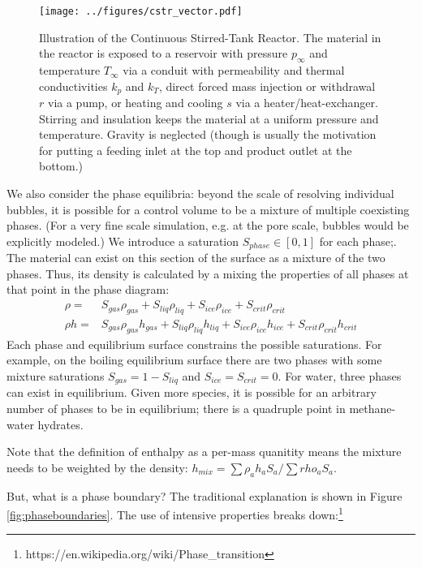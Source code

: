 \documentclass[AMA,STIX1COL]{WileyNJD-v2}
\begin{document}
\begin{figure}
  \centering
  \texttt{[image: ../figures/cstr\_vector.pdf]}
  \caption{ \label{fig:cstr} Illustration of the Continuous
    Stirred-Tank    
  Reactor. The material in the reactor is exposed to a reservoir with
  pressure
  $p_\infty$ and temperature $T_\infty$ via a conduit with permeability
  and thermal conductivities $k_p$ and $k_T$, direct forced mass
  injection or withdrawal $r$ via a pump, or heating and cooling $s$
  via a heater/heat-exchanger. Stirring and insulation keeps the
  material at a uniform pressure and temperature. Gravity is
  neglected (though is usually the motivation for putting a feeding inlet at
the top and product outlet at the bottom.)}
\end{figure}

We also consider the phase equilibria: beyond the scale of resolving
individual bubbles, it is possible
for a control volume to be a mixture of multiple coexisting
phases.
(For a very fine scale simulation, e.g. at the pore scale, bubbles
would be explicitly modeled.)
We introduce a saturation $S_{phase}\in[0,1]$ for each phase;.
The material can exist on this section of the surface as a mixture of
the two phases. Thus, its density is calculated by a mixing the
properties of all phases at that point in the phase diagram:
\begin{align}
  \rho = & S_{gas} \rho_{gas} + S_{liq} \rho_{liq} + S_{ice}
  \rho_{ice} + S_{crit} \rho_{crit} \\
  \rho h =& S_{gas} \rho_{gas} h_{gas} + S_{liq} \rho_{liq} h_{liq} + S_{ice}
  \rho_{ice} h_{ice} + S_{crit} \rho_{crit} h_{crit}
\end{align}
Each phase
and equilibrium surface constrains the possible saturations. For example, on the boiling equilibrium surface there are two phases with some mixture
saturations \(S_{gas}=1-S_{liq}\) and $S_{ice}=S_{crit}=0$. 
For water, three phases can exist in equilibrium. Given more species, it is possible for an arbitrary number of phases
to be in equilibrium; there is a quadruple point in methane-water
hydrates.

Note that the definition of enthalpy as a per-mass quanitity means the mixture needs to be weighted by the
density: $h_{mix}=\sum{\rho_a h_aS_a}/\sum{rho_aS_a}$.

But, what is a phase boundary? The traditional explanation is shown in
Figure \ref{fig:phaseboundaries}. The use of intensive properties breaks down:\footnote{https://en.wikipedia.org/wiki/Phase\_transition}
\end{document}
